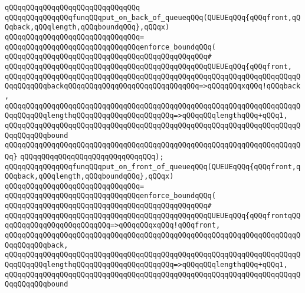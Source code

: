 \verb|qQQqqQQqqQQqqQQqqQQqqQQqqQQqqQQq|\newline
\newline
\verb|qQQqqQQqqQQqqQQqfunqQQqput_on_back_of_queueqQQq(QUEUEqQQq{qQQqfront,qQQqback,qQQqlength,qQQqboundqQQq},qQQqx)|\newline
\verb|qQQqqQQqqQQqqQQqqQQqqQQqqQQqqQQq=|\newline
\verb|qQQqqQQqqQQqqQQqqQQqqQQqqQQqqQQqenforce_boundqQQq(|\newline
\verb|qQQqqQQqqQQqqQQqqQQqqQQqqQQqqQQqqQQqqQQqqQQqqQQq#|\newline
\verb|qQQqqQQqqQQqqQQqqQQqqQQqqQQqqQQqqQQqqQQqqQQqqQQqQUEUEqQQq{qQQqfront,|\newline
\verb|qQQqqQQqqQQqqQQqqQQqqQQqqQQqqQQqqQQqqQQqqQQqqQQqqQQqqQQqqQQqqQQqqQQqqQQqqQQqqQQqbackqQQqqQQqqQQqqQQqqQQqqQQqqQQqqQQq=>qQQqqQQqxqQQq!qQQqback,|\newline
\verb|qQQqqQQqqQQqqQQqqQQqqQQqqQQqqQQqqQQqqQQqqQQqqQQqqQQqqQQqqQQqqQQqqQQqqQQqqQQqqQQqlengthqQQqqQQqqQQqqQQqqQQqqQQq=>qQQqqQQqlengthqQQq+qQQq1,|\newline
\verb|qQQqqQQqqQQqqQQqqQQqqQQqqQQqqQQqqQQqqQQqqQQqqQQqqQQqqQQqqQQqqQQqqQQqqQQqqQQqqQQqbound|\newline
\verb|qQQqqQQqqQQqqQQqqQQqqQQqqQQqqQQqqQQqqQQqqQQqqQQqqQQqqQQqqQQqqQQqqQQqqQQq}|\newline
\verb|qQQqqQQqqQQqqQQqqQQqqQQqqQQqqQQq);|\newline
\newline
\verb|qQQqqQQqqQQqqQQqfunqQQqput_on_front_of_queueqQQq(QUEUEqQQq{qQQqfront,qQQqback,qQQqlength,qQQqboundqQQq},qQQqx)|\newline
\verb|qQQqqQQqqQQqqQQqqQQqqQQqqQQqqQQq=|\newline
\verb|qQQqqQQqqQQqqQQqqQQqqQQqqQQqqQQqenforce_boundqQQq(|\newline
\verb|qQQqqQQqqQQqqQQqqQQqqQQqqQQqqQQqqQQqqQQqqQQqqQQq#|\newline
\verb|qQQqqQQqqQQqqQQqqQQqqQQqqQQqqQQqqQQqqQQqqQQqqQQqQUEUEqQQq{qQQqfrontqQQqqQQqqQQqqQQqqQQqqQQqqQQq=>qQQqqQQqxqQQq!qQQqfront,|\newline
\verb|qQQqqQQqqQQqqQQqqQQqqQQqqQQqqQQqqQQqqQQqqQQqqQQqqQQqqQQqqQQqqQQqqQQqqQQqqQQqqQQqback,|\newline
\verb|qQQqqQQqqQQqqQQqqQQqqQQqqQQqqQQqqQQqqQQqqQQqqQQqqQQqqQQqqQQqqQQqqQQqqQQqqQQqqQQqlengthqQQqqQQqqQQqqQQqqQQqqQQq=>qQQqqQQqlengthqQQq+qQQq1,|\newline
\verb|qQQqqQQqqQQqqQQqqQQqqQQqqQQqqQQqqQQqqQQqqQQqqQQqqQQqqQQqqQQqqQQqqQQqqQQqqQQqqQQqbound|\newline
